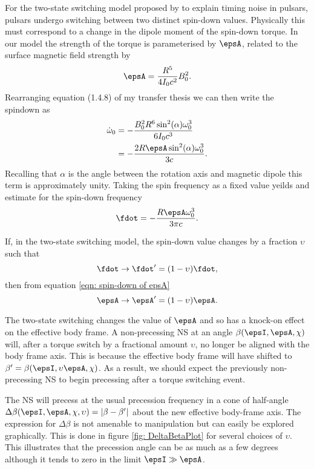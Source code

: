 \documentclass[/home/greg/Thesis/main/main.tex]{subfiles}
\begin{document}
For the two-state switching model proposed by \citet{Lyne2010} to explain 
timing noise in pulsars, pulsars undergo switching between two distinct spin-down
values. Physically this must correspond to a change in the dipole moment of
the spin-down torque. In our model the strength of the torque is parameterised
by $\epsA$, related to the surface magnetic field strength by 
\begin{align}
    \epsA = \frac{R^{5}}{4I_{0} c^{2}} B_{0}^{2}.
\end{align}
Rearranging equation (1.4.8) of my transfer thesis we can then write the 
spindown as 
\begin{align}
    \dot{\omega}_{0} & = -\frac{B_{0}^{2}R^{6} \sin^{2}(\alpha) \omega_{0}^{3}}{6 I_{0} c^{3}} \\
    & = - \frac{2 R \epsA \sin^{2}(\alpha) \omega_{0}^{3}}{3 c}.
\end{align}
Recalling that $\alpha$ is the angle between the rotation axis and magnetic dipole
this term is approximately unity. Taking the spin frequency as a fixed value yeilds
and estimate for the spin-down frequency
\begin{equation}
    \fdot = - \frac{R \epsA  \omega_{0}^{3}}{3\pi c}.
    \label{eqn: spin-down of epsA}
\end{equation}

If, in the two-state switching model, the spin-down value changes by a fraction
$\upsilon$ such that
\begin{equation}
    \fdot \rightarrow \fdot' = (1-\upsilon)\fdot,
\end{equation}
then from equation \eqref{eqn: spin-down of epsA} 
\begin{equation}
    \epsA \rightarrow \epsA' = (1-\upsilon)\epsA.
\end{equation}

The two-state switching changes the value of $\epsA$ and so has a knock-on 
effect on the effective body frame. A non-precessing NS at an
angle $\beta(\epsI, \epsA, \chi)$ will, after a torque switch by a fractional
amount $\upsilon$, no longer be aligned with the body frame axis. This is 
because the effective body frame will have shifted to 
$\beta' = \beta(\epsI, \upsilon\epsA, \chi)$. As a result, we should expect the
previously non-precessing NS to begin precessing after a torque switching event. 

The NS will precess at the usual precession frequency in a cone  of half-angle
$\Delta\beta(\epsI, \epsA, \chi, \upsilon)=|\beta - \beta'|$ about the new
effective body-frame axis.  The expression for $\Delta \beta$ is not amenable
to manipulation but can easily be explored graphically. This is done in figure
\ref{fig: DeltaBetaPlot} for several choices of $\upsilon$. This illustrates
that the precession angle can be as much as a few degrees although it tends to
zero in the limit $\epsI \gg \epsA$.
\end{document}
